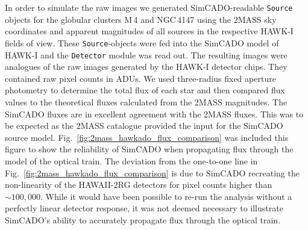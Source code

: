 In order to simulate the raw images we generated SimCADO-readable \verb+Source+ objects for the globular clusters M\,4 and NGC\,4147 using the 2MASS sky coordinates and apparent magnitudes of all sources in the respective HAWK-I fields of view. These \verb+Source+-objects were fed into the SimCADO model of HAWK-I and the \verb+Detector+ module was read out. The resulting images were analogues of the raw images generated by the HAWK-I detector chips. They contained raw pixel counts in ADUs. We used three-radius fixed aperture photometry to determine the total flux of each star and then compared flux values to the theoretical fluxes calculated from the 2MASS magnitudes. The SimCADO fluxes are in excellent agreement with the 2MASS fluxes. This was to be expected as the 2MASS catalogue provided the input for the SimCADO source model. 
Fig.~\ref{fig:2mass_hawkado_flux_comparison} was included this figure to show the reliability of SimCADO when propagating flux through the model of the optical train. 
The deviation from the one-to-one line in Fig.~\ref{fig:2mass_hawkado_flux_comparison} is due to SimCADO recreating the non-linearity of the HAWAII-2RG detectors for pixel counts higher than $\sim 100,000$. While it would have been possible to re-run the analysis without a perfectly linear detector response, it was not deemed necessary to illustrate SimCADO's ability to accurately propagate flux through the optical train. 

